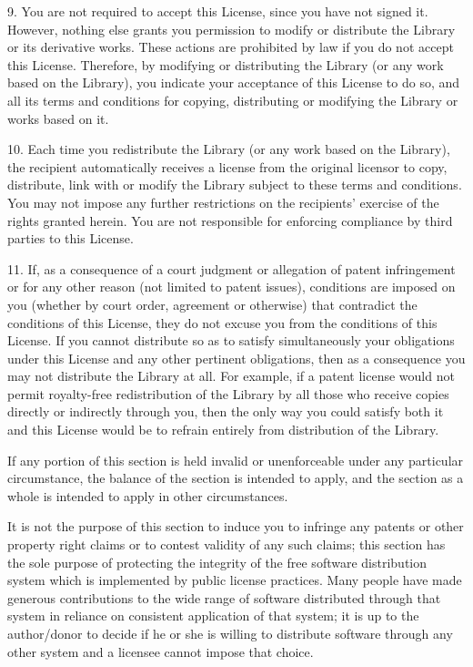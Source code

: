 \documentclass[twoside]{tceusermanual}
\begin{document}
9. You are not required to accept this License, since you have
not signed it.  However, nothing else grants you permission to
modify or distribute the Library or its derivative works.  These
actions are prohibited by law if you do not accept this
License.  Therefore, by modifying or distributing the Library
(or any work based on the Library), you indicate your acceptance
of this License to do so, and all its terms and conditions for
copying, distributing or modifying the Library or works based on
it.

10. Each time you redistribute the Library (or any work based on
the Library), the recipient automatically receives a license
from the original licensor to copy, distribute, link with or
modify the Library subject to these terms and conditions.  You
may not impose any further restrictions on the recipients'
exercise of the rights granted herein. You are not responsible
for enforcing compliance by third parties to this License.
 
11. If, as a consequence of a court judgment or allegation of
patent infringement or for any other reason (not limited to
patent issues), conditions are imposed on you (whether by court
order, agreement or otherwise) that contradict the conditions of
this License, they do not excuse you from the conditions of this
License.  If you cannot distribute so as to satisfy
simultaneously your obligations under this License and any other
pertinent obligations, then as a consequence you may not
distribute the Library at all.  For example, if a patent license
would not permit royalty-free redistribution of the Library by
all those who receive copies directly or indirectly through you,
then the only way you could satisfy both it and this License
would be to refrain entirely from distribution of the Library.

If any portion of this section is held invalid or unenforceable
under any particular circumstance, the balance of the section is
intended to apply, and the section as a whole is intended to
apply in other circumstances.

It is not the purpose of this section to induce you to infringe
any patents or other property right claims or to contest
validity of any such claims; this section has the sole purpose
of protecting the integrity of the free software distribution
system which is implemented by public license practices.  Many
people have made generous contributions to the wide range of
software distributed through that system in reliance on
consistent application of that system; it is up to the
author/donor to decide if he or she is willing to distribute
software through any other system and a licensee cannot impose
that choice.
\end{document}
